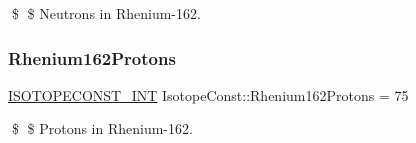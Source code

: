 \$ \$ Neutrons in Rhenium-\/162. \mbox{\label{group___isotope_const-_rhenium-_re162_gaffff9d89895688d949e044309f5d4b1b}} 
\subsubsection{\texorpdfstring{Rhenium162\+Protons}{Rhenium162Protons}}
{\footnotesize\ttfamily \mbox{\hyperlink{group___isotope_const-_macros_ga5f18360b3e99483a35c32d789e62621c}{I\+S\+O\+T\+O\+P\+E\+C\+O\+N\+S\+T\+\_\+\+I\+NT}} Isotope\+Const\+::\+Rhenium162\+Protons = 75}

\$ \$ Protons in Rhenium-\/162. 